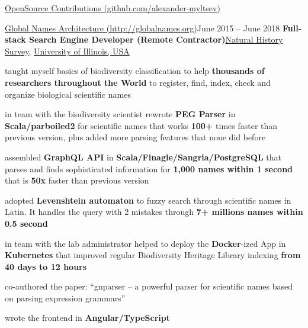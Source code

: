 \documentclass{resume} %
\begin{document}
\begin{rSection}{\href{https://github.com/alexander-myltsev?tab=repositories}{OpenSource
Contributions (github.com/alexander-myltsev)}}
\begin{samepage}
\begin{rSubsection}{\href{http://globalnames.org/}{Global Names Architecture
(http://globalnames.org)}}{June 2015 -- June 2018}
{\textbf{Full-stack Search Engine Developer (Remote Contractor)}}{\href{http://www.inhs.illinois.edu/}{Natural History Survey},
\href{http://illinois.edu/}{University of Illinois, USA}}
\item taught myself basics of biodiversity classification to help \textbf{thousands of researchers throughout the World} to register, find, index, check and organize
biological scientific names
\item in team with the biodiversity scientist rewrote \textbf{PEG Parser} in \textbf{Scala/parboiled2} for scientific names that works \textbf{100+} times faster than previous version, plus added more parsing features that none did before
\item assembled \textbf{GraphQL API} in \textbf{Scala/Finagle/Sangria/PostgreSQL} that parses and
finds sophisticated information for \textbf{1,000 names within 1 second} that is \textbf{50x} faster
than previous version
\item adopted \textbf{Levenshtein automaton} to fuzzy search through scientific names in Latin.
It handles the query with 2 mistakes through \textbf{7+ millions names within 0.5 second}
\item in team with the lab administrator helped to deploy the \textbf{Docker}-ized App in \textbf{Kubernetes} that improved regular Biodiversity Heritage Library indexing \textbf{from 40 days to 12 hours}
\item co-authored the paper: ``gnparser -- a powerful parser for scientific names based on parsing expression
grammars''
\item wrote the frontend in \textbf{Angular/TypeScript}
\end{rSubsection}
\end{samepage}


\end{rSection}
\end{document}
